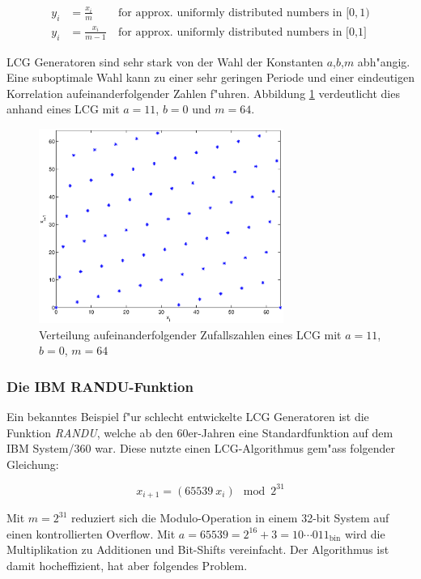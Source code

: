 \begin{refsection}
\begin{align}
	y_i &= \frac{x_i}{m} \: &\text{for approx. uniformly distributed numbers  in } [0,1)\\
	y_i &= \frac{x_i}{m-1} \: &\text{for approx. uniformly distributed numbers in [0,1]}
\end{align} 

LCG Generatoren sind sehr stark von der Wahl der Konstanten $a$,$b$,$m$
abh"angig. Eine suboptimale Wahl kann zu einer sehr geringen Periode
und einer eindeutigen Korrelation aufeinanderfolgender Zahlen
f"uhren. Abbildung \ref{fig:lcg_verteilung} verdeutlicht dies anhand
eines LCG mit $a=11$, $b=0$ und $m=64$.

\begin{figure}[h]
	\centering
	\includegraphics[width=8cm]{montecarlo/images/lcg.eps}
	\caption{Verteilung aufeinanderfolgender Zufallszahlen eines LCG mit $a=11$, $b=0$, $m=64$}
	\label{fig:lcg_verteilung}
\end{figure}

\subsubsection{Die IBM RANDU-Funktion}
Ein bekanntes Beispiel f"ur schlecht entwickelte LCG Generatoren ist die
Funktion \textit{RANDU}, welche ab den 60er-Jahren eine Standardfunktion
auf dem IBM System/360 war. Diese nutzte einen LCG-Algorithmus gem"ass
folgender Gleichung:

\begin{equation}
	x_{i+1} = \left( 65539 \: x_i \right) \mod{2^{31}}
	\label{equ:ibm_randu}
\end{equation}

Mit $m = 2^{31}$ reduziert sich die Modulo-Operation in einem 32-bit
System auf einen kontrollierten Overflow. Mit $a = 65539 = 2^{16} +
3 = 10\cdots011_{\text{bin}}$ wird die Multiplikation zu Additionen
und Bit-Shifts vereinfacht. Der Algorithmus ist damit hocheffizient,
hat aber folgendes Problem.


\end{refsection}
